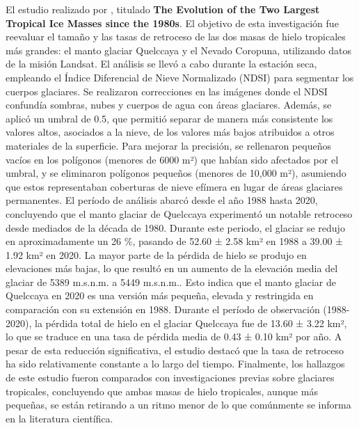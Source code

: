  El estudio realizado por \parencite{malone2022evolution}, titulado \textbf{The Evolution of the Two Largest Tropical Ice Masses since
 the 1980s}. El objetivo de esta investigación fue reevaluar el tamaño y las tasas de retroceso de las dos masas de hielo tropicales más grandes: el manto glaciar Quelccaya y el Nevado Coropuna, utilizando datos de la misión Landsat. El análisis se llevó a cabo durante la estación seca, empleando el Índice Diferencial de Nieve Normalizado (NDSI) para segmentar los cuerpos glaciares. Se realizaron correcciones en las imágenes donde el NDSI confundía sombras, nubes y cuerpos de agua con áreas glaciares. Además, se aplicó un umbral de 0.5, que permitió separar de manera más consistente los valores altos, asociados a la nieve, de los valores más bajos atribuidos a otros materiales de la superficie. Para mejorar la precisión, se rellenaron pequeños vacíos en los polígonos (menores de 6000 m²) que habían sido afectados por el umbral, y se eliminaron polígonos pequeños (menores de 10,000 m²), asumiendo que estos representaban coberturas de nieve efímera en lugar de áreas glaciares permanentes. El período de análisis abarcó desde el año 1988 hasta 2020, concluyendo que el manto glaciar de Quelccaya experimentó un notable retroceso desde mediados de la década de 1980. Durante este periodo, el glaciar se redujo en aproximadamente un 26 \%, pasando de 52.60 ± 2.58 km² en 1988 a 39.00 ± 1.92 km² en 2020. La mayor parte de la pérdida de hielo se produjo en elevaciones más bajas, lo que resultó en un aumento de la elevación media del glaciar de 5389 m.s.n.m. a 5449 m.s.n.m.. Esto indica que el manto glaciar de Quelccaya en 2020 es una versión más pequeña, elevada y restringida en comparación con su extensión en 1988. Durante el período de observación (1988-2020), la pérdida total de hielo en el glaciar Quelccaya fue de 13.60 ± 3.22 km², lo que se traduce en una tasa de pérdida media de 0.43 ± 0.10 km² por año. A pesar de esta reducción significativa, el estudio destacó que la tasa de retroceso ha sido relativamente constante a lo largo del tiempo. Finalmente, los hallazgos de este estudio fueron comparados con investigaciones previas sobre glaciares tropicales, concluyendo que ambas masas de hielo tropicales, aunque más pequeñas, se están retirando a un ritmo menor de lo que comúnmente se informa en la literatura científica.



